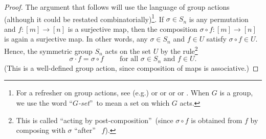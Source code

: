 \begin{proof}
The argument that follows will use the language of group actions (although it
could be restated combinatorially)\footnote{For a refresher on group actions,
see (e.g.) \cite[\S 3.2]{Quinlan21} or \cite[\S 9.11--\S 9.15]{Loehr-BC} or
\cite[\S 6.7--\S 6.9]{Artin} or \cite[Fall 2018, Weeks 8--10]%
{Armstrong-561fa18sp19} or \cite[\S 6.1]{Aigner07}. When $G$ is a group, we
use the word \textquotedblleft$G$\emph{-set}\textquotedblright\ to mean a set
on which $G$ acts.}. If $\sigma\in S_{n}$ is any permutation and $f:\left[
m\right]  \rightarrow\left[  n\right]  $ is a surjective map, then the
composition $\sigma\circ f:\left[  m\right]  \rightarrow\left[  n\right]  $ is
again a surjective map. In other words, any $\sigma\in S_{n}$ and $f\in U$
satisfy $\sigma\circ f\in U$. Hence, the symmetric group $S_{n}$ acts on the
set $U$ by the rule\footnote{This is called \textquotedblleft acting by
post-composition\textquotedblright\ (since $\sigma\circ f$ is obtained from
$f$ by composing with $\sigma$ \textquotedblleft after\textquotedblright%
\ $f$).}%
\[
\sigma\cdot f=\sigma\circ f\ \ \ \ \ \ \ \ \ \ \text{for all }\sigma\in
S_{n}\text{ and }f\in U.
\]
(This is a well-defined group action, since composition of maps is associative.)


\end{proof}
